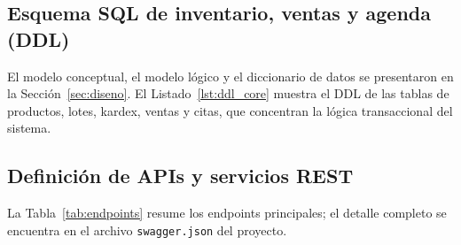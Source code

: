 \documentclass[11pt,a4paper]{report}
\begin{document}
\subsection{Esquema SQL de inventario, ventas y agenda (DDL)}
El modelo conceptual, el modelo lógico y el diccionario de datos se presentaron en la Sección~\ref{sec:diseno}. El Listado~\ref{lst:ddl_core} muestra el DDL de las tablas de productos, lotes, kardex, ventas y citas, que concentran la lógica transaccional del sistema.



\subsection{Definición de APIs y servicios REST}
La Tabla~\ref{tab:endpoints} resume los endpoints principales; el detalle completo se encuentra en el archivo \texttt{swagger.json} del proyecto.
\end{document}
